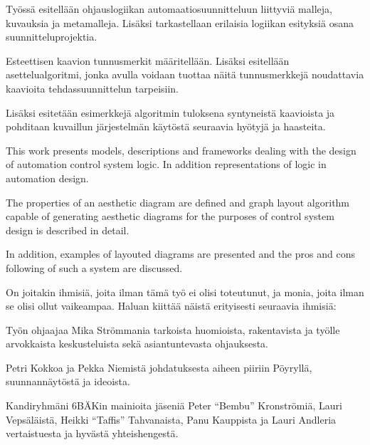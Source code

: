 \documentclass[finnish,12pt]{article}
\author{Ian Tuomi}
\date{6.12.2012}
\begin{document}
	 \makecoverpage

	\begin{abstractpage}[finnish]

Työssä esitellään ohjauslogiikan automaatiosuunnitteluun liittyviä malleja, kuvauksia ja metamalleja.
Lisäksi tarkastellaan erilaisia logiikan esityksiä osana suunnitteluprojektia.

Esteettisen kaavion tunnusmerkit määritellään.
Lisäksi esitellään asettelualgoritmi, jonka avulla voidaan tuottaa näitä tunnusmerkkejä noudattavia kaavioita tehdassuunnittelun tarpeisiin.

Lisäksi  esitetään esimerkkejä algoritmin tuloksena syntyneistä kaavioista ja pohditaan kuvaillun järjestelmän käytöstä seuraavia hyötyjä ja haasteita.

	\end{abstractpage}
	
	
	\begin{abstractpage}[english]
	
This work presents models, descriptions and frameworks dealing with the design of automation control system logic.
In addition representations of logic in automation design.

The properties of an aesthetic diagram are defined and graph layout algorithm capable of generating aesthetic diagrams for the purposes of control system design is described in detail.

In addition, examples of layouted diagrams are presented and the pros and cons following of such a system are discussed.

	\end{abstractpage}
	
	\newpage


On joitakin ihmisiä, joita ilman tämä työ ei olisi toteutunut, ja monia, joita ilman se olisi ollut vaikeampaa.
Haluan kiittää näistä erityisesti seuraavia ihmisiä:

Työn ohjaajaa Mika Strömmania tarkoista huomioista, rakentavista ja työlle arvokkaista keskusteluista sekä asiantuntevasta ohjauksesta.

Petri Kokkoa ja Pekka Niemistä johdatuksesta aiheen piiriin Pöyryllä, suunnannäytöstä ja ideoista.

Kandiryhmäni 6BÄKin mainioita jäseniä
Peter “Bembu”  Kronströmiä,
Lauri Vepsäläistä,
Heikki “Taffis”  Tahvanaista,
Panu Kauppista
ja Lauri Andleria
vertaistuesta ja hyvästä yhteishengestä.
\end{document}

